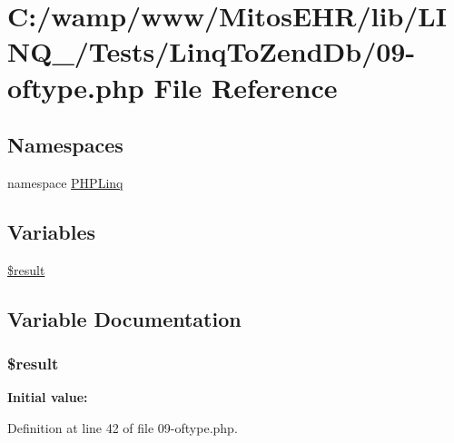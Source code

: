 \hypertarget{_linq_to_zend_db_209-oftype_8php}{\section{\-C\-:/wamp/www/\-Mitos\-E\-H\-R/lib/\-L\-I\-N\-Q\-\_/\-Tests/\-Linq\-To\-Zend\-Db/09-\/oftype.php \-File \-Reference}
\label{_linq_to_zend_db_209-oftype_8php}
}
\subsection*{\-Namespaces}
\begin{DoxyCompactItemize}
\item 
namespace \hyperlink{namespace_p_h_p_linq}{\-P\-H\-P\-Linq}
\end{DoxyCompactItemize}
\subsection*{\-Variables}
\begin{DoxyCompactItemize}
\item 
\hyperlink{_linq_to_zend_db_209-oftype_8php_a112ef069ddc0454086e3d1e6d8d55d07}{\$result}
\end{DoxyCompactItemize}


\subsection{\-Variable \-Documentation}
\hypertarget{_linq_to_zend_db_209-oftype_8php_a112ef069ddc0454086e3d1e6d8d55d07}{
\subsubsection[{\$result}]{\setlength{\rightskip}{0pt plus 5cm}\$result}}\label{_linq_to_zend_db_209-oftype_8php_a112ef069ddc0454086e3d1e6d8d55d07}
{\bfseries \-Initial value\-:}


\-Definition at line 42 of file 09-\/oftype.\-php.

